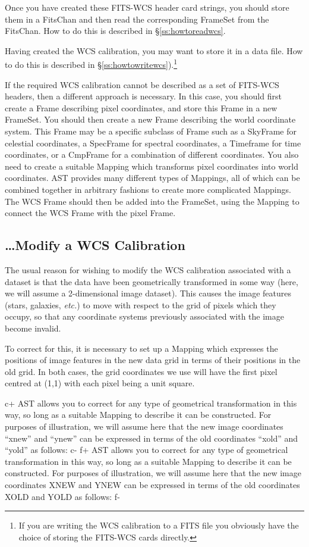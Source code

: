 \documentclass[twoside,11pt]{article}
\newcommand{\secref}[1]{\S\ref{#1}}
\newcommand{\secref}[1]{\ref{#1}}
\begin{document}
Once you have created these FITS-WCS header card strings, you should
store them in a FitsChan and then read the corresponding FrameSet from the
FitsChan. How to do this is described in \secref{ss:howtoreadwcs}.

Having created the WCS calibration, you may want to store it in a data
file. How to do this is described in \secref{ss:howtowritewcs}).\footnote{If 
you are writing the WCS calibration to a FITS file you obviously
have the choice of storing the FITS-WCS cards directly.}

If the required WCS calibration cannot be described as a set of FITS-WCS 
headers, then a different approach is necessary. In this case, you should
first create a Frame describing pixel coordinates, and store this Frame
in a new FrameSet. You should then create a new Frame describing the
world coordinate system. This Frame may be a specific subclass of Frame such
as a SkyFrame for celestial coordinates, a SpecFrame for spectral
coordinates, a Timeframe for time coordinates, or a CmpFrame for a combination 
of different coordinates.
You also need to create a suitable Mapping which transforms pixel
coordinates into world coordinates. AST provides many different types of
Mappings, all of which can be combined together in arbitrary fashions to
create more complicated Mappings. The WCS Frame should then be added into
the FrameSet, using the Mapping to connect the WCS Frame with the pixel
Frame.

\subsection{\label{ss:howtomodifywcs}\ldots Modify a WCS Calibration}

The usual reason for wishing to modify the WCS calibration associated
with a dataset is that the data have been geometrically transformed in
some way (here, we will assume a 2-dimensional image dataset). This
causes the image features (stars, galaxies, {\em{etc.}}) to move with
respect to the grid of pixels which they occupy, so that any
coordinate systems previously associated with the image become
invalid.

To correct for this, it is necessary to set up a Mapping which
expresses the positions of image features in the new data grid in
terms of their positions in the old grid. In both cases, the grid
coordinates we use will have the first pixel centred at (1,1) with
each pixel being a unit square.

c+
AST allows you to correct for any type of geometrical transformation
in this way, so long as a suitable Mapping to describe it can be
constructed. For purposes of illustration, we will assume here that
the new image coordinates ``xnew'' and ``ynew'' can be expressed in
terms of the old coordinates ``xold'' and ``yold'' as follows:
c-
f+
AST allows you to correct for any type of geometrical transformation
in this way, so long as a suitable Mapping to describe it can be
constructed. For purposes of illustration, we will assume here that
the new image coordinates XNEW and YNEW can be expressed in terms of
the old coordinates XOLD and YOLD as follows:
f-
\end{document}
